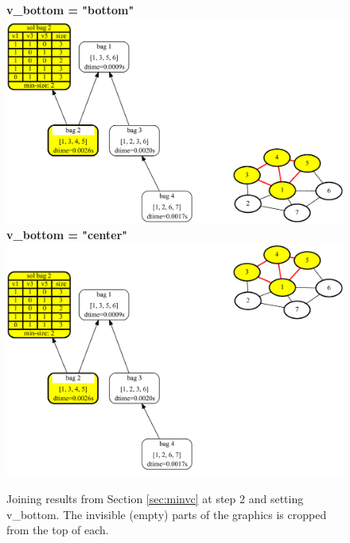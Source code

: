 \documentclass[a4paper, 12pt, bibliography=totoc]{scrartcl}
\begin{document}
\begin{figure}[H]
	\centering
	\textbf{v\_bottom = "bottom"} \vspace{1em}\\
	
	\includegraphics[width=\linewidth]{images/SVGJOIN/default_bottom2.pdf}\\
	\vspace{0.5em}
	\textbf{v\_bottom = "center"}\\
	
	\vspace{0.6em}
	\includegraphics[width=0.9\linewidth]{images/SVGJOIN/default_center2.pdf}
	\caption{Joining results from Section \ref{sec:minvc} at step 2 and setting v\_bottom. The invisible (empty) parts of the graphics is cropped from the top of each.}
	\label{fig:joinbotcenter}
\end{figure}
\end{document}
